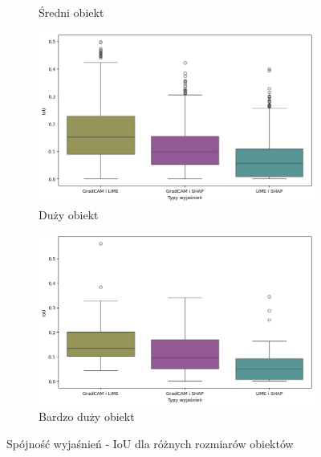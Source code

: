 \begin{figure}[h]
\begin{subfigure}[b]{0.3\textwidth}
		\caption{Średni obiekt}  \label{}
	\end{subfigure}
	\begin{subfigure}[b]{0.3\textwidth}
		\centering\includegraphics[width=1\textwidth]{img/base_coherence_size_L}
		\caption{Duży obiekt}  \label{}
	\end{subfigure}
	\begin{subfigure}[b]{0.3\textwidth}
		\centering\includegraphics[width=1\textwidth]{img/base_coherence_size_XL}
		\caption{Bardzo duży obiekt}  \label{}
	\end{subfigure}
	\caption{Spójność wyjaśnień - IoU dla różnych rozmiarów obiektów}
	\label{rys:coherence_size}
\end{figure}

